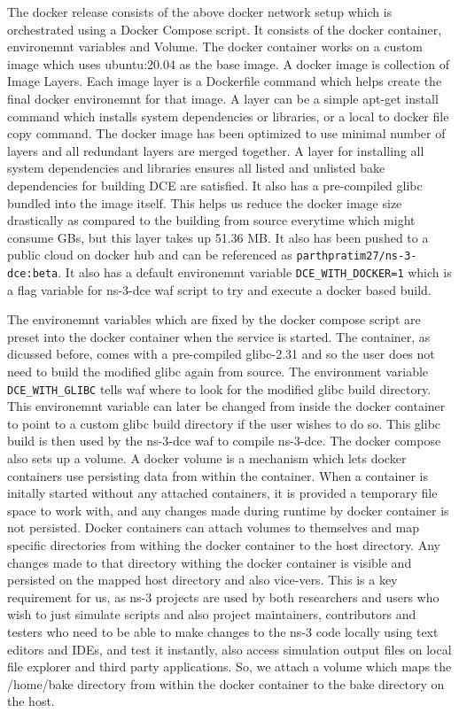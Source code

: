 \documentclass{sig-alternate}
\begin{document}
The docker release consists of the above docker network setup which is orchestrated using a Docker Compose script. 
It consists of the docker container, environemnt variables and Volume. The docker 
container works on a custom image which uses ubuntu:20.04 as the base image. A docker image is collection of Image Layers. Each image layer is a 
Dockerfile command which helps create the final docker environemnt for that image. A layer can be a simple apt-get install command which installs 
system dependencies or libraries, or a local to docker file copy command. The docker image has been optimized to use minimal number of layers and 
all redundant layers are merged together. A layer for installing all system dependencies and libraries ensures all listed and unlisted bake 
dependencies for building DCE are satisfied. It also has a pre-compiled glibc bundled into the image itself. This helps us reduce the docker 
image size drastically as compared to the building from source everytime which might consume GBs, but this layer takes up 51.36 MB. It also has been 
pushed to a public cloud on docker hub and can be referenced as \texttt{parthpratim27/ns-3-dce:beta}. It also has a default environemnt variable 
\texttt{DCE\_WITH\_DOCKER=1} which is a flag variable for ns-3-dce waf script to try and execute a docker based build.

The environemnt variables which are fixed by the docker compose script are preset into the docker container when the service is started.
The container, as dicussed before, comes with a pre-compiled glibc-2.31 and so the user does not need to build the modified glibc again from source.
The environment variable \texttt{DCE\_WITH\_GLIBC} tells waf where to look for the modified glibc build directory. This environemnt variable can 
later be changed from inside the docker container to point to a custom glibc build directory if the user wishes to do so. This glibc build is then 
used by the ns-3-dce waf to compile ns-3-dce. The docker compose also sets up a volume. A docker volume is a mechanism which lets docker containers 
use persisting data from within the container. When a container is initally started without any attached containers, it is provided a temporary 
file space to work with, and any changes made during runtime by docker container is not persisted. Docker containers can attach volumes to themselves
and map specific directories from withing the docker container to the host directory. Any changes made to that directory withing the  docker container
is visible and persisted on the mapped host directory and also vice-vers. This is a key requirement for us, as ns-3 projects are used by both 
researchers and users who wish to just simulate scripts and also project maintainers, contributors and testers who need to be able to make changes 
to the ns-3 code locally using text editors and IDEs, and test it instantly, also access simulation output files on local file explorer and 
third party applications. So, we attach a volume which maps the /home/bake directory from within the docker container to the bake directory on 
the host.
\end{document}
